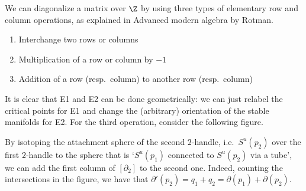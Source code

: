 We can diagonalize a matrix over $\Z$ by using three types of elementary row and column operations, as explained in Advanced modern algebra by Rotman.\sidenotemark
\begin{samepage}
\begin{enumerate}[E1]
    \item Interchange two rows or columns
    \item Multiplication of a row or column by $-1$
    \item Addition of a row (resp.~column) to another row (resp.~column)
\end{enumerate}
\end{samepage}
It is clear that E1 and E2 can be done geometrically: we can just relabel the critical points for E1 and change the (arbitrary) orientation of the stable manifolds for E2.
For the third operation, consider the following figure.
\begin{figure}[H]
    \centering
\end{figure}
By isotoping the attachment sphere of the second $2$-handle, i.e.\ $S^{u}(p_2)$ over the first $2$-handle to the sphere that is `$S^{u}(p_1)$ connected to $S^{u}(p_2)$ via a tube', we can add the first column of $[\partial_2]$ to the second one. Indeed, counting the intersections in the figure, we have that $\partial'(p_2) = q_1 + q_2 = \partial(p_1) + \partial(p_2)$.


